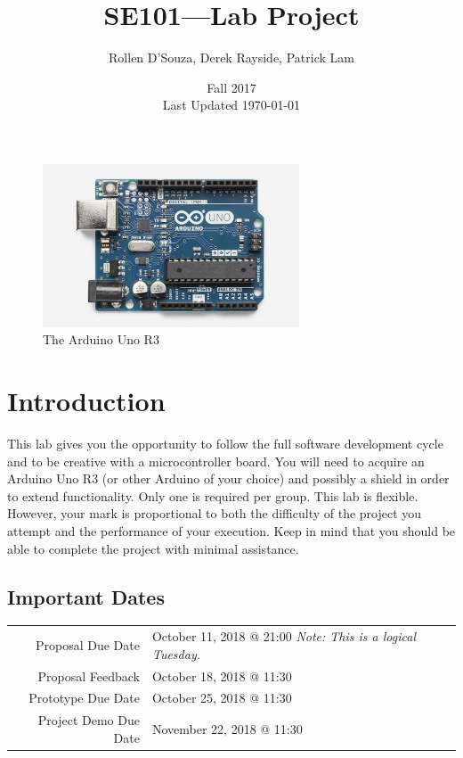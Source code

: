 \documentclass{article}
\begin{document}
\title{\vspace{-0.5in}SE101---Lab Project}
\author{Rollen D'Souza, Derek Rayside, Patrick Lam}
\date{Fall 2017\\Last Updated \today}
\maketitle

\begin{figure}[ht]
\centering
\includegraphics[width=3in]{images/Uno.jpg}
\caption{The Arduino Uno R3~\cite{arduinoUno}}
\label{fig:arduinoUno}
\end{figure}

\section*{Introduction}
This lab gives you the opportunity to follow the full software development cycle and to be creative with a microcontroller board.  You will need to acquire an Arduino Uno R3 (or other Arduino of your choice) and possibly a shield in order to extend functionality.  Only one is required per group.  This lab is flexible.  However, your mark is proportional to both the difficulty of the project you attempt and the performance of your execution.  Keep in mind that you should be able to complete the project with minimal assistance.

\subsection*{Important Dates}
\begin{tabular}{rl}
Proposal Due Date & October 11, 2018 @ 21:00 \quad \emph{Note: This is a logical Tuesday.}\\
Proposal Feedback & October 18, 2018 @ 11:30\\
Prototype Due Date & October 25, 2018 @ 11:30\\
Project Demo Due Date & November 22, 2018 @ 11:30
\end{tabular}
\end{document}
